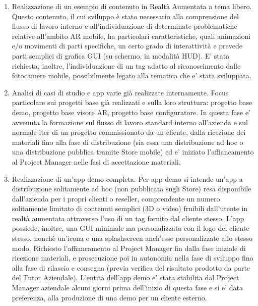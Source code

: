 \begin{enumerate}
	\item	Realizzazione di un esempio di contenuto in Realtà Aumentata a tema libero. Questo contenuto, il cui sviluppo è stato necessario alla comprensione del flusso di lavoro interno e all'individuazione di determinate problematiche relative all’ambito AR mobile, ha particolari caratteristiche, quali animazioni e/o movimenti di parti specifiche, un certo grado di interattività e prevede parti semplici di grafica GUI (su schermo, in modalità HUD). E' stata richiesta, inoltre, l’individuazione di un tag adatto al riconoscimento dalle fotocamere mobile, possibilmente legato alla tematica che e' stata sviluppata.
	\item	Analisi di casi di studio e app varie già realizzate internamente. Focus particolare sui progetti base già realizzati e sulla loro struttura: progetto base demo, progetto base visore AR, progetto base configuratore. In questa fase e' avvenuta la formazione sul flusso di lavoro standard interno all’azienda e sul normale iter di un progetto commissionato da un cliente, dalla ricezione dei materiali fino alla fase di distribuzione (sia essa una distribuzione ad hoc o una distribuzione pubblica tramite Store mobile) ed e' iniziato l'affiancamento al Project Manager nelle fasi di accettazione materiali. 
	\item	Realizzazione di un’app demo completa. Per app demo si intende un’app a distribuzione solitamente ad hoc (non pubblicata sugli Store) resa disponibile dall’azienda per i propri clienti o reseller, comprendente un numero solitamente limitato di contenuti semplici (3D o video) fruibili dall’utente in realtà aumentata attraverso l’uso di un tag fornito dal cliente stesso. L’app possiede, inoltre, una GUI minimale ma personalizzata con il logo del cliente stesso, nonchè un’icona e una splashscreen anch’esse personalizzate allo stesso modo. Richiesto l'affiancamento al Project Manager fin dalla fase iniziale di ricezione materiali, e prosecuzione poi in autonomia nella fase di sviluppo fino alla fase di rilascio e consegna (previa verifica del risultato prodotto da parte del Tutor Aziendale). L’entità dell’app demo e' stata stabilita dal Project Manager aziendale alcuni giorni prima dell’inizio di questa fase e si e' data preferenza, alla produzione di una demo per un cliente esterno. 

\end{enumerate}
